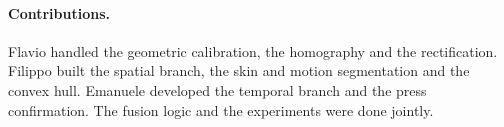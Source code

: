 \documentclass[11pt]{article}
\begin{document}
\paragraph{Contributions.}
Flavio handled the geometric calibration, the homography and the rectification.
Filippo built the spatial branch, the skin and motion segmentation and the convex
hull. Emanuele developed the temporal branch and the press confirmation. The
fusion logic and the experiments were done jointly.



\end{document}
